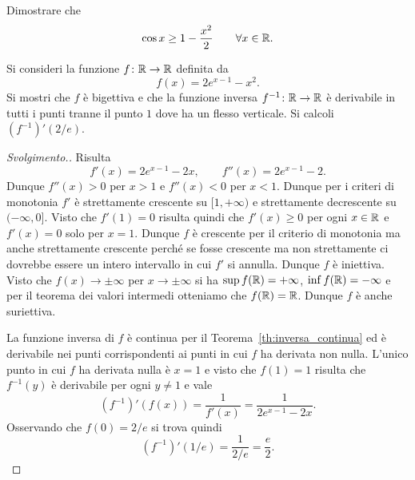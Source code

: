 \begin{exercise}
Dimostrare che
\[
  \cos x \ge 1- \frac{x^2}{2} \qquad \forall x \in \mathbb R.
\]
\end{exercise}

\begin{exercise}
Si consideri la funzione $f\colon \mathbb R \to \mathbb R$ definita da
\[
  f(x) = 2e^{x-1} - x^2.
\]
Si mostri che $f$ è bigettiva e
che la funzione inversa $f^{-1}\colon \mathbb R \to \mathbb R$ è derivabile in
tutti i punti tranne il punto $1$ dove ha un flesso verticale.
Si calcoli $(f^{-1})'(2/e)$.
\end{exercise}
\begin{proof}[Svolgimento.]
Risulta
\[
  f'(x) = 2e^{x-1} - 2x, \qquad f''(x) = 2e^{x-1}-2.
\]
Dunque $f''(x) > 0$ per $x > 1$ e $f''(x)< 0$ per $x<1$.
Dunque per i criteri di monotonia
$f'$ è strettamente crescente su $[1,+\infty)$ e strettamente
decrescente su $(-\infty, 0]$. Visto che $f'(1)=0$ risulta quindi che
$f'(x)\ge 0$ per ogni $x\in \mathbb R$ e $f'(x)=0$ solo per $x=1$.
Dunque $f$ è crescente per il criterio di monotonia ma anche
strettamente crescente perché se fosse crescente ma non strettamente
ci dovrebbe essere un intero intervallo in cui $f'$ si annulla.
Dunque $f$ è iniettiva. Visto che $f(x)\to \pm\infty$ per $x\to \pm\infty$
si ha $\sup f(\mathbb R) = +\infty$, $\inf f(\mathbb R) = -\infty$ e per il teorema dei valori intermedi
otteniamo che $f(\mathbb R)=\mathbb R$. Dunque $f$ è anche suriettiva.

La funzione inversa di $f$ è continua per il Teorema~\ref{th:inversa_continua}
ed è derivabile nei punti corrispondenti ai punti in cui $f$ ha derivata non nulla.
L'unico punto in cui $f$ ha derivata nulla è $x=1$ e visto che $f(1) = 1$ risulta
che $f^{-1}(y)$ è derivabile per ogni $y\neq 1$ e vale
\[
  (f^{-1})'(f(x)) = \frac{1}{f'(x)} = \frac{1}{2 e^{x-1}-2x}.
\]
Osservando che $f(0)=2/e$ si trova quindi
\[
  (f^{-1})'(1/e) = \frac{1}{2/e} = \frac e 2.
\]
\end{proof}

